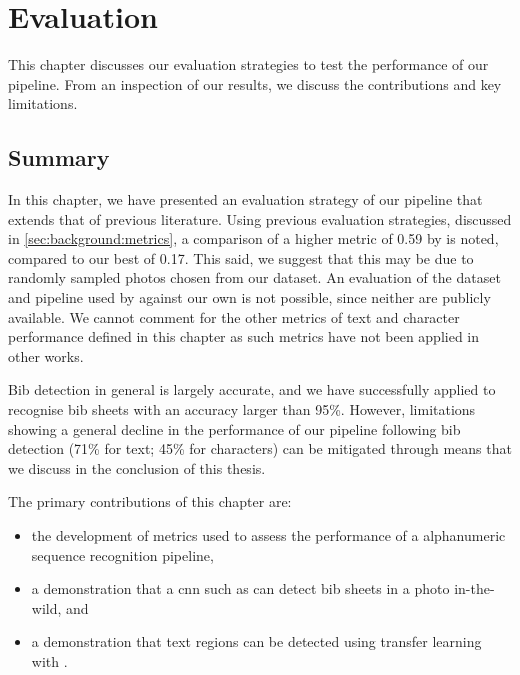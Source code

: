 \chapter{Evaluation}
\label{ch:evaluation}

This chapter discusses our evaluation strategies to test the performance of our pipeline. From an inspection of our results, we discuss the contributions and key limitations.



\clearpage

\clearpage

\section{Summary}

In this chapter, we have presented an evaluation strategy of our pipeline that extends that of previous literature. Using previous evaluation strategies, discussed in \cref{sec:background:metrics}, a comparison of a higher \fscore{} metric of 0.59 by \citet{Benami:2012jf} is noted, compared to our best of 0.17. This said, we suggest that this may be due to randomly sampled photos chosen from our dataset. An evaluation of the dataset and pipeline used by \citeauthor{Benami:2012jf} against our own is not possible, since neither are publicly available. We cannot comment for the other metrics of text and character performance defined in this chapter as such metrics have not been applied in other works. 

Bib detection in general is largely accurate, and we have successfully applied \frcnn{} to recognise bib sheets with an accuracy larger than 95\%. However, limitations showing a general decline in the performance of our pipeline following bib detection (71\% for text; 45\% for characters) can be mitigated through means that we discuss in the conclusion of this thesis.

\bigskip

\noindent
The primary contributions of this chapter are:

\begin{itemize}
  \item the development of metrics used to assess the performance of a alphanumeric sequence recognition pipeline,
  \item a demonstration that a \gls{cnn} such as \frcnn{} can detect bib sheets in a photo in-the-wild, and
  \item a demonstration that text regions can be detected using transfer learning with \frcnn{}.
\end{itemize}

